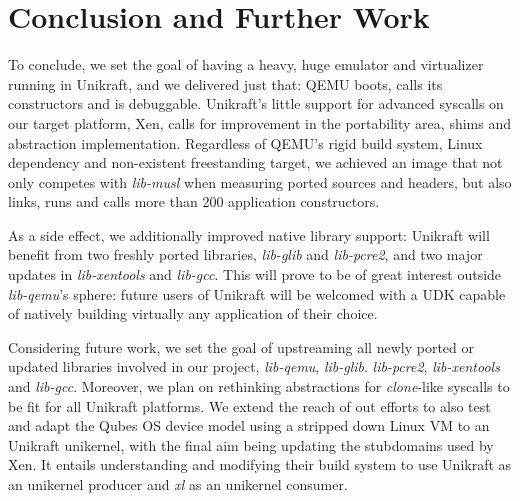 \chapter{Conclusion and Further Work}
\label{chapter:conclusion-further-work}

To conclude, we set the goal of having a heavy, huge emulator and virtualizer running in Unikraft, and we delivered just that: QEMU boots, calls its constructors and is debuggable.
Unikraft's little support for advanced syscalls on our target platform, Xen, calls for improvement in the portability area, shims and abstraction implementation.
Regardless of QEMU's rigid build system, Linux dependency and non-existent freestanding target, we achieved an image that not only competes with \textit{lib-musl} when measuring ported sources and headers, but also links, runs and calls more than 200 application constructors.

As a side effect, we additionally improved native library support: Unikraft will benefit from two freshly ported libraries, \textit{lib-glib} and \textit{lib-pcre2}, and two major updates in \textit{lib-xentools} and \textit{lib-gcc}.
This will prove to be of great interest outside \textit{lib-qemu}'s sphere: future users of Unikraft will be welcomed with a UDK capable of natively building virtually any application of their choice.

Considering future work, we set the goal of upstreaming all newly ported or updated libraries involved in our project, \textit{lib-qemu}, \textit{lib-glib}. \textit{lib-pcre2}, \textit{lib-xentools} and \textit{lib-gcc}.
Moreover, we plan on rethinking abstractions for \textit{clone}-like syscalls to be fit for all Unikraft platforms.
We extend the reach of out efforts to also test and adapt the Qubes OS device model using a stripped down Linux VM to an Unikraft unikernel, with the final aim being updating the stubdomains used by Xen.
It entails understanding and modifying their build system to use Unikraft as an unikernel producer and \textit{xl} as an unikernel consumer.
